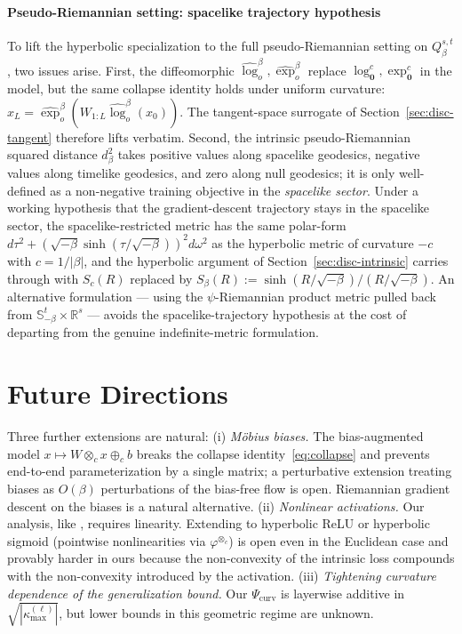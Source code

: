 \documentclass[letterpaper]{article}
\newcommand{\R}{\mathbb{R}}
\newcommand{\Mobm}{\otimes_c}
\newcommand{\exps}{\exp_{\mathbf{0}}^c}
\newcommand{\logs}{\log_{\mathbf{0}}^c}
\begin{document}
\paragraph{Pseudo-Riemannian setting: spacelike trajectory hypothesis}
\label{sec:disc-pseudo}

To lift the hyperbolic specialization to the full pseudo-Riemannian
setting on $Q_\beta^{s,t}$, two issues arise. First, the diffeomorphic
$\widehat{\log}^\beta_o, \widehat{\exp}^\beta_o$ replace
$\logs, \exps$ in the model, but the same collapse identity holds under
uniform curvature: $x_L = \widehat{\exp}^\beta_o(W_{1:L}
\widehat{\log}^\beta_o(x_0))$. The tangent-space surrogate of
Section~\ref{sec:disc-tangent} therefore lifts verbatim. Second, the
intrinsic pseudo-Riemannian squared distance $d_\beta^2$ takes positive
values along spacelike geodesics, negative values along timelike
geodesics, and zero along null geodesics; it is only well-defined as a
non-negative training objective in the \emph{spacelike sector}. Under a
working hypothesis that the gradient-descent trajectory stays in the
spacelike sector, the spacelike-restricted metric has the same polar-form
$d\tau^2 + (\sqrt{-\beta}\sinh(\tau/\sqrt{-\beta}))^2 d\omega^2$ as the
hyperbolic metric of curvature $-c$ with $c = 1/|\beta|$, and the
hyperbolic argument of Section~\ref{sec:disc-intrinsic} carries through
with $S_c(R)$ replaced by $S_\beta(R) := \sinh(R/\sqrt{-\beta}) /
(R/\sqrt{-\beta})$. An alternative formulation — using the
$\psi$-Riemannian product metric pulled back from $\mathbb S^t_{-\beta}
\times \R^s$ — avoids the spacelike-trajectory hypothesis at the cost of
departing from the genuine indefinite-metric formulation.


\section{Future Directions}
\label{sec:future}


Three further extensions are natural:
\textup{(i)} \emph{M\"obius biases.} The bias-augmented model $x \mapsto W
\otimes_c x \oplus_c b$ breaks the collapse identity~\eqref{eq:collapse}
and prevents end-to-end parameterization by a single matrix; a
perturbative extension treating biases as $O(\beta)$ perturbations of the
bias-free flow is open. Riemannian gradient descent on the biases is a
natural alternative.
\textup{(ii)} \emph{Nonlinear activations.} Our analysis, like
\cite{arora2018convergence}, requires linearity. Extending to hyperbolic
ReLU or hyperbolic sigmoid (pointwise nonlinearities via
$\varphi^{\Mobm}$) is open even in the Euclidean case and provably harder
in ours because the non-convexity of the intrinsic loss compounds with
the non-convexity introduced by the activation.
\textup{(iii)} \emph{Tightening curvature dependence of the generalization
bound.} Our $\Psi_{\mathrm{curv}}$ is layerwise additive in
$\sqrt{|\kappa_{\max}^{(\ell)}|}$, but lower bounds in this geometric
regime are unknown.
\end{document}
